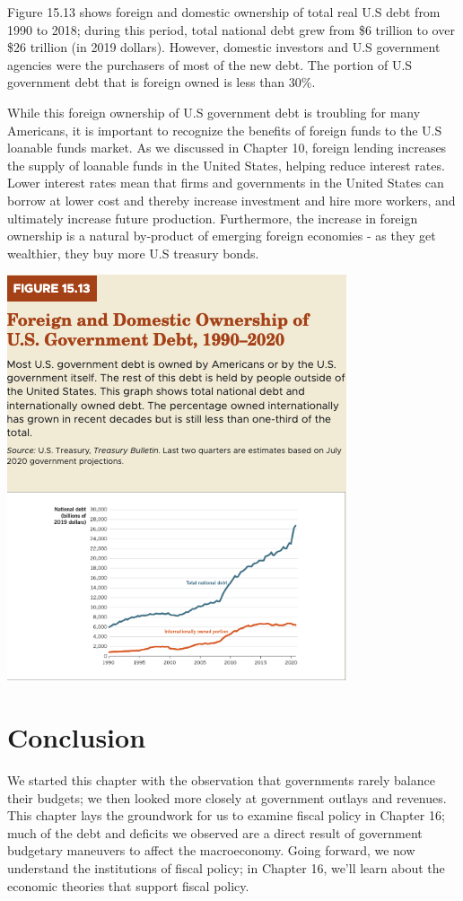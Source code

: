 \documentclass[11pt]{article} %
\begin{document}
Figure 15.13 shows foreign and domestic ownership of total real U.S debt from 1990 to 2018; during this period, total national debt grew from \$6 trillion to over \$26 trillion (in 2019 dollars). However, domestic investors and U.S government agencies were the purchasers of most of the new debt. The portion of U.S government debt that is foreign owned is less than 30\%.

While this foreign ownership of U.S government debt is troubling for many Americans, it is important to recognize the benefits of foreign funds to the U.S loanable funds market. As we discussed in Chapter 10, foreign lending increases the supply of loanable funds in the United States, helping reduce interest rates. Lower interest rates mean that firms and governments in the United States can borrow at lower cost and thereby increase investment and hire more workers, and ultimately increase future production. Furthermore, the increase in foreign ownership is a natural by-product of emerging foreign economies - as they get wealthier, they buy more U.S treasury bonds.

\begin{center}
\includegraphics[scale=0.5]{images/Figure 15.13.png}
\end{center}

\section*{Conclusion}
We started this chapter with the observation that governments rarely balance their budgets; we then looked more closely at government outlays and revenues. This chapter lays the groundwork for us to examine fiscal policy in Chapter 16; much of the debt and deficits we observed are a direct result of government budgetary maneuvers to affect the macroeconomy. Going forward, we now understand the institutions of fiscal policy; in Chapter 16, we'll learn about the economic theories that support fiscal policy.
\end{document}
